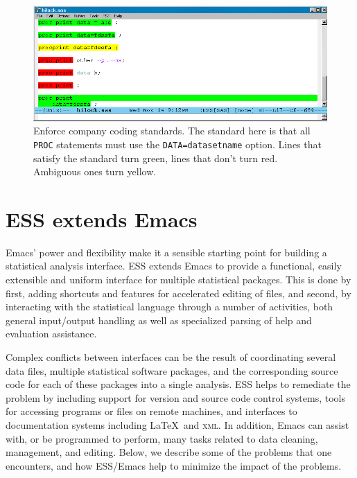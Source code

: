 \documentclass{article}
\newcommand{\stexttt}[1]{{\small\texttt{#1}}}
\begin{document}
\begin{figure}[htbp]
  \centering
  \includegraphics[angle=270,width=\textwidth]{hilock-sas}
  \caption{Enforce company coding
    standards.  The standard here is that all \stexttt{PROC}
    statements must use the \stexttt{DATA=datasetname} option.  Lines
    that satisfy the standard turn green, lines that don't turn red.
    Ambiguous ones turn yellow.} %
  \label{f.hilock}
\end{figure}

\section{ESS extends Emacs}
\label{sec:ess-extends-emacs}

Emacs' power and flexibility make it a sensible starting point for
building a statistical analysis interface.  ESS extends Emacs to
provide a functional, easily extensible and uniform interface for
multiple statistical packages.  This is done by first, adding
shortcuts and features for accelerated editing of files, and second,
by interacting with the statistical language through a number of
activities, both general input/output handling as well as specialized
parsing of help and evaluation assistance.

Complex conflicts between interfaces can be the result of coordinating
several data files, multiple statistical software packages, and the
corresponding source code for each of these packages into a single
analysis.  ESS helps to remediate the problem by including support for
version and source code control systems, tools for accessing programs
or files on remote machines, and interfaces to documentation systems
including \LaTeX\ and \textsc{xml}.  In addition, Emacs can assist
with, or be programmed to perform, many tasks related to data
cleaning, management, and editing.  Below, we describe some of the
problems that one encounters, and how ESS/Emacs help to minimize the
impact of the problems.
\end{document}
